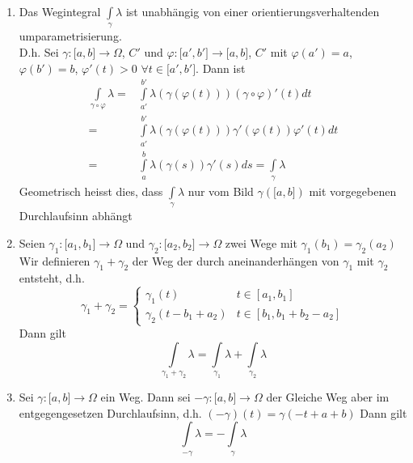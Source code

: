 \begin{enumerate}[\indent E1)]
\item Das Wegintegral $\int\limits_\gamma  \lambda  $ ist unabhängig von einer orientierungsverhaltenden umparametrisierung. \\
D.h. Sei $\gamma :\lbrack a,b\rbrack\rightarrow\Omega$, $C'$ und $\varphi :\lbrack a',b'\rbrack\rightarrow\lbrack a,b\rbrack$, $C'$ mit $\varphi\left( a'\right)=a$, $\varphi\left( b'\right)=b$, $\varphi'\left( t\right) >0$ $\forall t\in\lbrack a', b'\rbrack$. Dann ist 
\begin{align*}
\int\limits_{\gamma  \circ \varphi } \lambda   = &\int\limits_{a'}^{b'} {\lambda \left( {\gamma \left( {\varphi (t)} \right)} \right)\left( {\gamma  \circ \varphi } \right)'(t)dt} \\
 = &\int\limits_{a'}^{b'} {\lambda \left( {\gamma \left( {\varphi (t)} \right)} \right)\gamma '\left( {\varphi (t)} \right)\varphi '(t)dt} \\
 = &\int\limits_a^b {\lambda \left( {\gamma \left( s \right)} \right)\gamma '\left( s \right)ds = \int\limits_\gamma  \lambda  } 
\end{align*}
Geometrisch heisst dies, dass $\int\limits_\gamma  \lambda$ nur vom Bild $\gamma\left( \lbrack a,b\rbrack\right)$ mit vorgegebenen Durchlaufsinn abhängt
\item Seien $\gamma_1:\lbrack a_1,b_1\rbrack\rightarrow\Omega$ und $\gamma_2:\lbrack a_2,b_2\rbrack\rightarrow\Omega$ zwei Wege mit $\gamma_1\left( b_1\right)=\gamma_2\left(a_2\right)$ 
Wir definieren $\gamma_1+\gamma_2$ der Weg der durch aneinanderhängen von $\gamma_1$ mit $\gamma_2$ entsteht, d.h.
\[{\gamma _1} + {\gamma _2} = \left\{ {\begin{array}{*{20}{c}}
{{\gamma _1}(t)}&{t \in \left[ {{a_1},{b_1}} \right]}\\
{{\gamma _2}\left( {t - {b_1} + {a_2}} \right)}&{t \in \left[ {{b_1},{b_1} + {b_2} - {a_2}} \right]}
\end{array}} \right.\]
Dann gilt \[\int\limits_{{\gamma _1} + {\gamma _2}} \lambda   = \int\limits_{{\gamma _1}} \lambda   + \int\limits_{{\gamma _2}} \lambda  \]
\item Sei $\gamma:\lbrack a,b\rbrack\rightarrow\Omega$ ein Weg. Dann sei $-\gamma:\lbrack a,b\rbrack\rightarrow\Omega$ der Gleiche Weg aber im entgegengesetzen Durchlaufsinn, d.h. $\left( -\gamma\right) (t)=\gamma\left( -t+a+b\right)$ 
Dann gilt \[\int\limits_{ - \gamma } \lambda   =  - \int\limits_\gamma  \lambda  \]

\end{enumerate}
